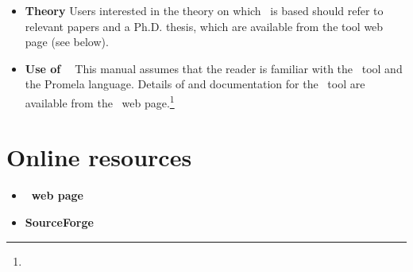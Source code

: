 \begin{itemize}

\item {\bf Theory } Users interested in the theory on which
\topspin\ is based should refer to relevant papers and a Ph.D.
thesis, which are available from the tool web page (see below).

\item {\bf Use of \spin\ } This manual assumes that the reader is
familiar with the \spin\ tool and the Promela language.  Details of
and documentation for the \spin\ tool are available from the \spin\
web page.\footnote{\texttt{\spinurl}}

\end{itemize}

\section*{Online resources}

\begin{itemize}

\item {\bf \topspin\ web page } \texttt{\topspinwebpage}

\item {\bf SourceForge } \texttt{\sourceforgepage}

\end{itemize}

